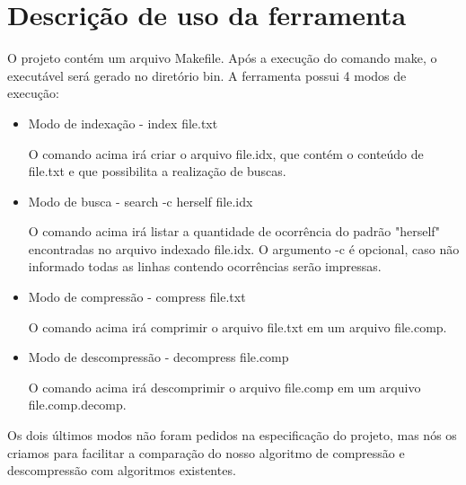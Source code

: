 \section{Descrição de uso da ferramenta \ipmt}

O projeto contém um arquivo Makefile. Após a execução do comando make, o
executável \ipmt será gerado no diretório bin. A ferramenta \ipmt possui 4 modos
de execução:

\begin{itemize}

\item Modo de indexação - \ipmt index file.txt

    O comando acima irá criar o arquivo file.idx, que contém o conteúdo de
    file.txt e que possibilita a realização de buscas.

\item Modo de busca - \ipmt search -c herself file.idx

    O comando acima irá listar a quantidade de ocorrência do padrão "herself"
    encontradas no arquivo indexado file.idx. O argumento -c é opcional, caso
    não informado todas as linhas contendo ocorrências serão impressas.

\item Modo de compressão - \ipmt compress file.txt

    O comando acima irá comprimir o arquivo file.txt em um arquivo file.comp.

\item Modo de descompressão - \ipmt decompress file.comp

    O comando acima irá descomprimir o arquivo file.comp em um arquivo
    file.comp.decomp.

\end{itemize}

Os dois últimos modos não foram pedidos na especificação do projeto, mas nós os
criamos para facilitar a comparação do nosso algoritmo de compressão e
descompressão com algoritmos existentes.
